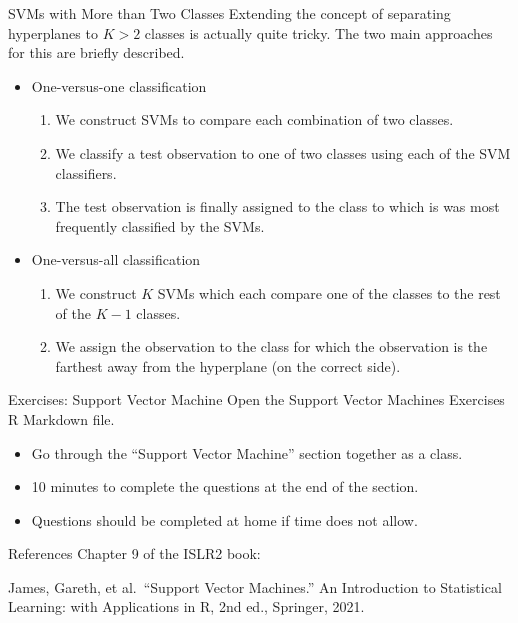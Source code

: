 \documentclass[
  ignorenonframetext,
  aspectratio=169,
]{beamer}
\begin{document}
\begin{frame}{SVMs with More than Two Classes}
\protect\hypertarget{svms-with-more-than-two-classes}{}
Extending the concept of separating hyperplanes to \(K > 2\) classes is
actually quite tricky. The two main approaches for this are briefly
described.

\begin{itemize}
\item
  One-versus-one classification

  \begin{enumerate}
  \item
    We construct SVMs to compare each combination of two classes.
  \item
    We classify a test observation to one of two classes using each of
    the SVM classifiers.
  \item
    The test observation is finally assigned to the class to which is
    was most frequently classified by the SVMs.
  \end{enumerate}
\item
  One-versus-all classification

  \begin{enumerate}
  \item
    We construct \(K\) SVMs which each compare one of the classes to the
    rest of the \(K-1\) classes.
  \item
    We assign the observation to the class for which the observation is
    the farthest away from the hyperplane (on the correct side).
  \end{enumerate}
\end{itemize}
\end{frame}

\begin{frame}{Exercises: Support Vector Machine}
\protect\hypertarget{exercises-support-vector-machine}{}
Open the Support Vector Machines Exercises R Markdown file.

\begin{itemize}
\item
  Go through the ``Support Vector Machine'' section together as a class.
\item
  10 minutes to complete the questions at the end of the section.
\item
  Questions should be completed at home if time does not allow.
\end{itemize}
\end{frame}

\begin{frame}{References}
\protect\hypertarget{references}{}
Chapter 9 of the ISLR2 book:

James, Gareth, et al.~``Support Vector Machines.'' An Introduction to
Statistical Learning: with Applications in R, 2nd ed., Springer, 2021.
\end{frame}
\end{document}
